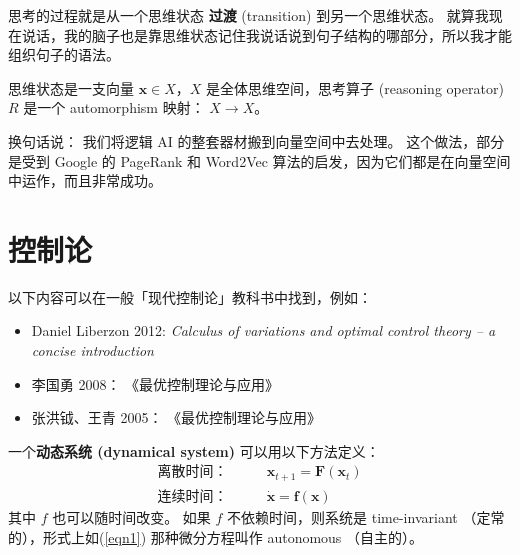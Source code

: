 \documentclass[orivec]{llncs}
\newcommand{\emp}[1]{\textbf{\textcolor{Cerulean}{#1}}}
\newcommand{\vect}[1]{\boldsymbol{#1}}
\begin{document}
思考的过程就是从一个思维状态 \emp{过渡} (transition) 到另一个思维状态。 就算我现在说话，我的脑子也是靠思维状态记住我说话说到句子结构的哪部分，所以我才能组织句子的语法。

思维状态是一支向量 $\vect{x} \in X$，$X$ 是全体思维空间，思考算子 (reasoning operator) $R$ 是一个 automorphism 映射： $X \rightarrow X$。



换句话说： 我们将逻辑 AI 的整套器材搬到向量空间中去处理。 这个做法，部分是受到 Google 的 PageRank 和 Word2Vec \cite{Mikolov2013} 算法的启发，因为它们都是在向量空间中运作，而且非常成功。 %

\section{控制论}

以下内容可以在一般「现代控制论」教科书中找到，例如：
\let\labelitemi\labelitemii
\begin{itemize}
\item Daniel Liberzon 2012: \textit{Calculus of variations and optimal control theory -- a concise introduction}
\item 李国勇 2008： 《最优控制理论与应用》
\item 张洪钺、王青 2005： 《最优控制理论与应用》
\end{itemize}

一个\emp{动态系统 (dynamical system)} 可以用以下方法定义：
\begin{eqnarray}
\mbox{离散时间：} \quad \quad & \vect{x}_{t+1} = \vect{F}(\vect{x}_t) \\
\mbox{连续时间：} \quad \quad & \dot{\vect{x}} = \vect{f}(\vect{x}) \label{eqn1}
\end{eqnarray}
其中 $f$ 也可以随时间改变。 如果 $f$ 不依赖时间，则系统是 time-invariant （定常的），形式上如(\ref{eqn1}) 那种微分方程叫作 autonomous （自主的）。
\end{document}
